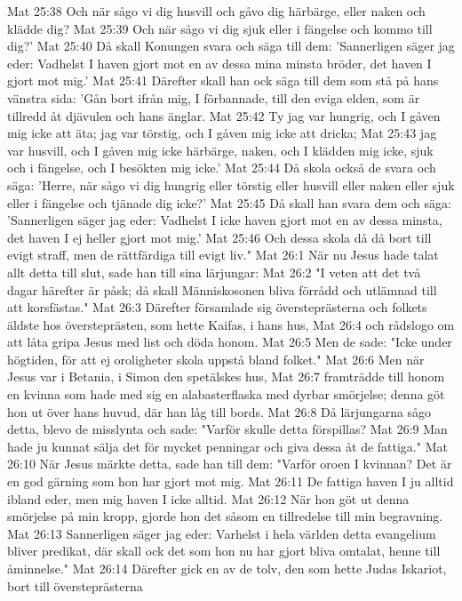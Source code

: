 Mat 25:38  Och när sågo vi dig husvill och gåvo dig härbärge, eller naken och klädde dig?
Mat 25:39  Och när sågo vi dig sjuk eller i fängelse och kommo till dig?'
Mat 25:40  Då skall Konungen svara och säga till dem: 'Sannerligen säger jag eder: Vadhelst I haven gjort mot en av dessa mina minsta bröder, det haven I gjort mot mig.'
Mat 25:41  Därefter skall han ock säga till dem som stå på hans vänstra sida: 'Gån bort ifrån mig, I förbannade, till den eviga elden, som är tillredd åt djävulen och hans änglar.
Mat 25:42  Ty jag var hungrig, och I gåven mig icke att äta; jag var törstig, och I gåven mig icke att dricka;
Mat 25:43  jag var husvill, och I gåven mig icke härbärge, naken, och I klädden mig icke, sjuk och i fängelse, och I besökten mig icke.'
Mat 25:44  Då skola också de svara och säga: 'Herre, när sågo vi dig hungrig eller törstig eller husvill eller naken eller sjuk eller i fängelse och tjänade dig icke?'
Mat 25:45  Då skall han svara dem och säga: 'Sannerligen säger jag eder: Vadhelst I icke haven gjort mot en av dessa minsta, det haven I ej heller gjort mot mig.'
Mat 25:46  Och dessa skola då då bort till evigt straff, men de rättfärdiga till evigt liv."
Mat 26:1  När nu Jesus hade talat allt detta till slut, sade han till sina lärjungar:
Mat 26:2  "I veten att det två dagar härefter är påsk; då skall Människosonen bliva förrådd och utlämnad till att korsfästas."
Mat 26:3  Därefter församlade sig översteprästerna och folkets äldste hos översteprästen, som hette Kaifas, i hans hus,
Mat 26:4  och rådslogo om att låta gripa Jesus med list och döda honom.
Mat 26:5  Men de sade: "Icke under högtiden, för att ej oroligheter skola uppstå bland folket."
Mat 26:6  Men när Jesus var i Betania, i Simon den spetälskes hus,
Mat 26:7  framträdde till honom en kvinna som hade med sig en alabasterflaska med dyrbar smörjelse; denna göt hon ut över hans huvud, där han låg till bords.
Mat 26:8  Då lärjungarna sågo detta, blevo de misslynta och sade: "Varför skulle detta förspillas?
Mat 26:9  Man hade ju kunnat sälja det för mycket penningar och giva dessa åt de fattiga."
Mat 26:10  När Jesus märkte detta, sade han till dem: "Varför oroen I kvinnan? Det är en god gärning som hon har gjort mot mig.
Mat 26:11  De fattiga haven I ju alltid ibland eder, men mig haven I icke alltid.
Mat 26:12  När hon göt ut denna smörjelse på min kropp, gjorde hon det såsom en tillredelse till min begravning.
Mat 26:13  Sannerligen säger jag eder: Varhelst i hela världen detta evangelium bliver predikat, där skall ock det som hon nu har gjort bliva omtalat, henne till åminnelse."
Mat 26:14  Därefter gick en av de tolv, den som hette Judas Iskariot, bort till översteprästerna
